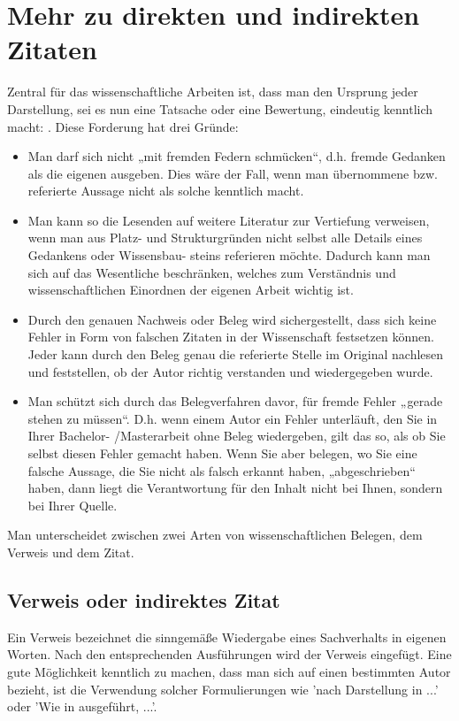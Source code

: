 \documentclass[12pt,oneside]{article}
\begin{document}
\section{Mehr zu direkten und indirekten Zitaten}\label{app:zitieren}
Zentral für das wissenschaftliche Arbeiten ist, dass man den Ursprung jeder Darstellung, sei es nun
eine Tatsache oder eine Bewertung, eindeutig kenntlich macht: \cite{shiny1}. Diese
Forderung hat drei Gründe:
\begin{itemize}
\item Man darf sich nicht „mit fremden Federn schmücken“, d.h. fremde Gedanken als die
eigenen ausgeben. Dies wäre der Fall, wenn man übernommene bzw. referierte Aussage
nicht als solche kenntlich macht.
\item  Man kann so die Lesenden auf weitere Literatur zur Vertiefung verweisen, wenn man aus
Platz- und Strukturgründen nicht selbst alle Details eines Gedankens oder Wissensbau-
steins referieren möchte. Dadurch kann man sich auf das Wesentliche beschränken,
welches zum Verständnis und wissenschaftlichen Einordnen der eigenen Arbeit wichtig ist.
\item Durch den genauen Nachweis oder Beleg wird sichergestellt, dass sich keine Fehler in
Form von falschen Zitaten in der Wissenschaft festsetzen können. Jeder kann durch den
Beleg genau die referierte Stelle im Original nachlesen und feststellen, ob der Autor richtig
verstanden und wiedergegeben wurde.
\item Man schützt sich durch das Belegverfahren davor, für fremde Fehler „gerade stehen zu
müssen“. D.h. wenn einem Autor ein Fehler unterläuft, den Sie in Ihrer Bachelor-
/Masterarbeit ohne Beleg wiedergeben, gilt das so, als ob Sie selbst diesen Fehler
gemacht haben. Wenn Sie aber belegen, wo Sie eine falsche Aussage, die Sie nicht als
falsch erkannt haben, „abgeschrieben“ haben, dann liegt die Verantwortung für den Inhalt
nicht bei Ihnen, sondern bei Ihrer Quelle.
\end{itemize}
Man unterscheidet zwischen zwei Arten von wissenschaftlichen Belegen, dem Verweis und dem
Zitat.
\subsection{Verweis oder indirektes Zitat}
Ein Verweis bezeichnet die sinngemäße Wiedergabe eines Sachverhalts in eigenen Worten. Nach
den entsprechenden Ausführungen wird der Verweis \cite{clemen1989combining} eingefügt. 
Eine gute Möglichkeit kenntlich zu machen, dass man sich auf einen bestimmten Autor bezieht, ist
die Verwendung solcher Formulierungen wie 'nach Darstellung in \cite{clemen1989combining} ...' oder 'Wie in \cite{clemen1989combining} ausgeführt, ...'.
\end{document}
